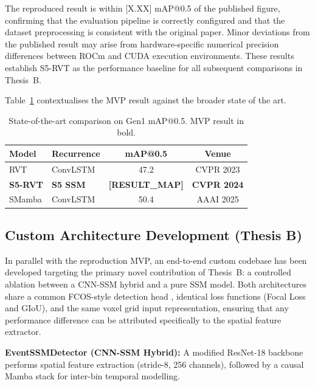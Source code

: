 \documentclass[11pt, a4paper]{report}
\begin{document}
The reproduced result is within [X.XX] mAP@0.5 of the published figure, confirming that the evaluation pipeline is correctly configured and that the dataset preprocessing is consistent with the original paper. Minor deviations from the published result may arise from hardware-specific numerical precision differences between ROCm and CUDA execution environments. These results establish S5-RVT as the performance baseline for all subsequent comparisons in Thesis~B.

Table~\ref{tab:state_of_art_compare} contextualises the MVP result against the broader state of the art.

\begin{table}[h]
\centering
\caption{State-of-the-art comparison on Gen1 mAP@0.5. MVP result in bold.}
\label{tab:state_of_art_compare}
\renewcommand{\arraystretch}{1.4}
\begin{tabular}{llcc}
\toprule
\textbf{Model} & \textbf{Recurrence} & \textbf{mAP@0.5} & \textbf{Venue} \\
\midrule
RVT \cite{gehrig2023recurrent}          & ConvLSTM  & 47.2  & CVPR 2023 \\
\textbf{S5-RVT \cite{zubic2024state}}   & \textbf{S5 SSM}    & \textbf{[RESULT\_MAP]} & \textbf{CVPR 2024} \\
SMamba \cite{yang2025smamba}             & ConvLSTM  & 50.4  & AAAI 2025 \\
\bottomrule
\end{tabular}
\end{table}

\subsection{Custom Architecture Development (Thesis B)}
\label{subsec:custom_arch}

In parallel with the reproduction MVP, an end-to-end custom codebase has been developed targeting the primary novel contribution of Thesis~B: a controlled ablation between a CNN-SSM hybrid and a pure SSM model. Both architectures share a common FCOS-style detection head \cite{tian2019fcos}, identical loss functions (Focal Loss \cite{lin2017focal} and GIoU), and the same voxel grid input representation, ensuring that any performance difference can be attributed specifically to the spatial feature extractor.

\textbf{EventSSMDetector (CNN-SSM Hybrid):} A modified ResNet-18 backbone performs spatial feature extraction (stride-8, 256 channels), followed by a causal Mamba stack for inter-bin temporal modelling.
\end{document}
